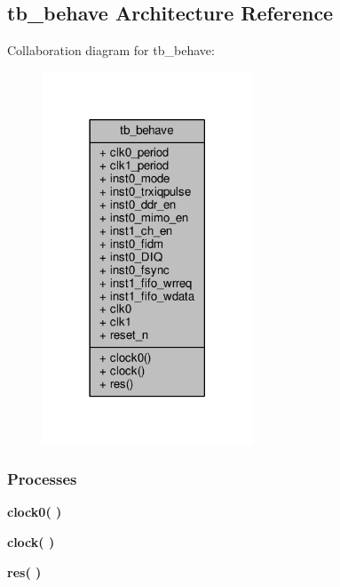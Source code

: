 \subsection{tb\+\_\+behave Architecture Reference}
\label{classdiq2fifo__tb_1_1tb__behave}


Collaboration diagram for tb\+\_\+behave\+:\nopagebreak
\begin{figure}[H]
\begin{center}
\leavevmode
\includegraphics[width=177pt]{d9/d45/classdiq2fifo__tb_1_1tb__behave__coll__graph}
\end{center}
\end{figure}
\subsubsection*{Processes}
 \begin{DoxyCompactItemize}
\item 
{\bf clock0}{\bfseries  (  )}
\item 
{\bf clock}{\bfseries  (  )}
\item 
{\bf res}{\bfseries  (  )}
\end{DoxyCompactItemize}
